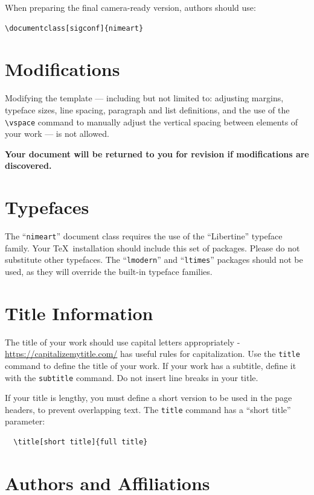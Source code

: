 \documentclass[sigconf]{nimeart}
\begin{document}
When preparing the final camera-ready version, authors should use:
\begin{verbatim}
\documentclass[sigconf]{nimeart}
\end{verbatim}

\section{Modifications}

Modifying the template --- including but not limited to: adjusting
margins, typeface sizes, line spacing, paragraph and list definitions,
and the use of the \verb|\vspace| command to manually adjust the
vertical spacing between elements of your work --- is not allowed.

{\bfseries Your document will be returned to you for revision if
  modifications are discovered.}

\section{Typefaces}

The ``\verb|nimeart|'' document class requires the use of the
``Libertine'' typeface family. Your \TeX\ installation should include
this set of packages. Please do not substitute other typefaces. The
``\verb|lmodern|'' and ``\verb|ltimes|'' packages should not be used,
as they will override the built-in typeface families.

\section{Title Information}

The title of your work should use capital letters appropriately -
\url{https://capitalizemytitle.com/} has useful rules for
capitalization. Use the {\verb|title|} command to define the title of
your work. If your work has a subtitle, define it with the
{\verb|subtitle|} command.  Do not insert line breaks in your title.

If your title is lengthy, you must define a short version to be used
in the page headers, to prevent overlapping text. The \verb|title|
command has a ``short title'' parameter:
\begin{verbatim}
  \title[short title]{full title}
\end{verbatim}

\section{Authors and Affiliations}
\end{document}
